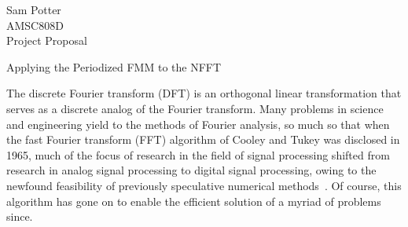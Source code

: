 \documentclass{article}
\begin{document}
\noindent Sam Potter \\
\noindent AMSC808D \\
\noindent Project Proposal \\

\begin{center}
  \huge{Applying the Periodized FMM to the NFFT}
\end{center}





The discrete Fourier transform (DFT) is an orthogonal linear
transformation that serves as a discrete analog of the Fourier
transform. Many problems in science and engineering yield to the
methods of Fourier analysis, so much so that when the fast Fourier
transform (FFT) algorithm of Cooley and Tukey was disclosed in 1965,
much of the focus of research in the field of signal processing
shifted from research in analog signal processing to digital signal
processing, owing to the newfound feasibility of previously
speculative numerical methods~\cite{book:dsp75}. Of course, this
algorithm has gone on to enable the efficient solution of a myriad of
problems since.
\end{document}

